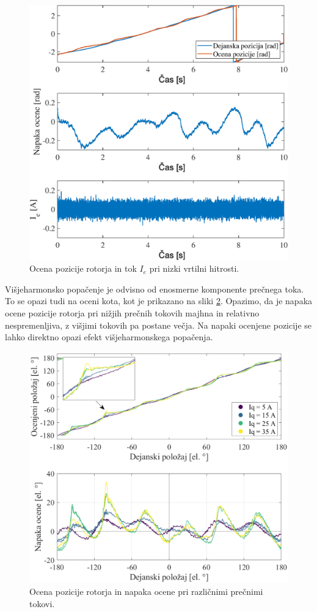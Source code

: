 \documentclass[a4paper,twoside,openright,12pt,slovene]{book}
\begin{document}
\begin{figure}[!htbp]
    \centering
    \includegraphics[width=0.9\columnwidth]{Slike/HighLoadRun.eps}
    \caption{\label{HighLoadRun} Ocena pozicije rotorja in tok $I_e$ pri nizki vrtilni hitrosti. }
\end{figure}

\newpage 

Višjeharmonsko popačenje je odvisno od enosmerne komponente prečnega toka. To se opazi tudi na oceni kota, kot je prikazano na sliki \ref{vsiljenaPozicijaTokovi_angleError}. Opazimo, da je napaka
ocene pozicije rotorja pri nižjih prečnih tokovih majhna in relativno nespremenljiva, z višjimi tokovih pa postane večja. Na napaki ocenjene pozicije se lahko direktno opazi efekt višjeharmonskega
popačenja. 

\begin{figure}[!htbp]
    \centering
    \includegraphics[width=1.05\columnwidth]{Slike/vsiljenaPozicijaTokovi_angleError.eps}
    \caption{\label{vsiljenaPozicijaTokovi_angleError} Ocena pozicije rotorja in napaka ocene pri različnimi prečnimi tokovi. }
\end{figure}
\end{document}
